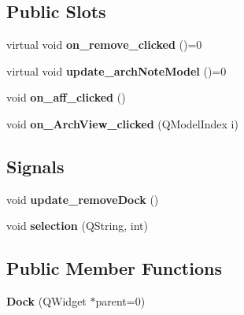 \subsection*{Public Slots}
\begin{DoxyCompactItemize}
\item 
\mbox{\label{class_dock_a74bd1a9145a04fe37c1c97bedd7c460d}} 
virtual void {\bfseries on\+\_\+remove\+\_\+clicked} ()=0
\item 
\mbox{\label{class_dock_aba7e136be0e7bbff8cf76369e10982c0}} 
virtual void {\bfseries update\+\_\+arch\+Note\+Model} ()=0
\item 
\mbox{\label{class_dock_a162f55159baba3ad2f485c1cbfb67fe2}} 
void {\bfseries on\+\_\+aff\+\_\+clicked} ()
\item 
\mbox{\label{class_dock_a88d9948db78eddd5551bb47e4cb63277}} 
void {\bfseries on\+\_\+\+Arch\+View\+\_\+clicked} (Q\+Model\+Index i)
\end{DoxyCompactItemize}
\subsection*{Signals}
\begin{DoxyCompactItemize}
\item 
\mbox{\label{class_dock_aca603632e4561e582254273c234d97a8}} 
void {\bfseries update\+\_\+remove\+Dock} ()
\item 
\mbox{\label{class_dock_a8abd37c4496e6c548ecb4ecb685679a1}} 
void {\bfseries selection} (Q\+String, int)
\end{DoxyCompactItemize}
\subsection*{Public Member Functions}
\begin{DoxyCompactItemize}
\item 
\mbox{\label{class_dock_a1e81e2926e94969514ac45a9d839731c}} 
{\bfseries Dock} (Q\+Widget $\ast$parent=0)
\end{DoxyCompactItemize}
